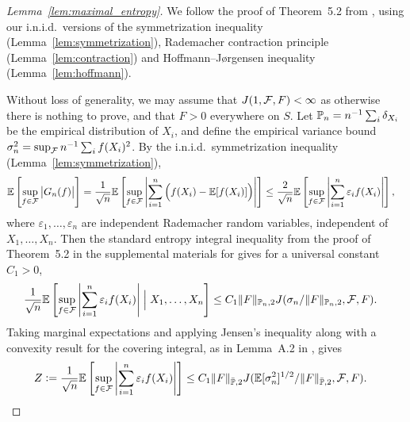 \begin{proof}[Lemma~\ref{lem:maximal_entropy}]

  We follow the proof of Theorem~5.2
  from \citet{chernozhukov2014gaussian},
  using our i.n.i.d.\ versions of the symmetrization inequality
  (Lemma~\ref{lem:symmetrization}),
  Rademacher contraction principle
  (Lemma~\ref{lem:contraction})
  and Hoffmann--J{\o}rgensen inequality
  (Lemma~\ref{lem:hoffmann}).

  Without loss of generality,
  we may assume that $J(1, \cF, F) < \infty$
  as otherwise there is nothing to prove,
  and that $F > 0$ everywhere on $S$.
  Let $\P_n = n^{-1} \sum_i \delta_{X_i}$
  be the empirical distribution
  of $X_i$,
  and define the empirical variance bound
  $\sigma_n^2 = \sup_\cF n^{-1} \sum_i f(X_i)^2$.
  By the i.n.i.d.\ symmetrization inequality
  (Lemma~\ref{lem:symmetrization}),
  \begin{align*}
    \E \left[
      \sup_{f \in \cF}
      \big| G_n(f) \big|
    \right]
    &=
    \frac{1}{\sqrt n}
    \E \left[
      \sup_{f \in \cF}
      \left|
      \sum_{i=1}^n
      \Big(
      f(X_i)
      - \E[f(X_i)]
      \Big)
      \right|
    \right]
    \leq
    \frac{2}{\sqrt n}
    \E \left[
      \sup_{f \in \cF}
      \left|
      \sum_{i=1}^n
      \varepsilon_i
      f(X_i)
      \right|
    \right],
  \end{align*}
  where $\varepsilon_1, \ldots, \varepsilon_n$
  are independent Rademacher random variables,
  independent of $X_1, \ldots, X_n$.
  Then the standard entropy integral inequality
  from the proof of Theorem~5.2 in
  the supplemental materials for
  \citet{chernozhukov2014gaussian}
  gives for a universal constant $C_1 > 0$,
  \begin{align*}
    \frac{1}{\sqrt n}
    \E \left[
      \sup_{f \in \cF}
      \left|
      \sum_{i=1}^n
      \varepsilon_i
      f(X_i)
      \right|
      \Bigm\vert
      X_1, \ldots, X_n
    \right]
    &\leq
    C_1 \|F\|_{\P_n,2}
    J(\sigma_n / \|F\|_{\P_n,2}, \cF, F).
  \end{align*}
  Taking marginal expectations
  and applying Jensen's inequality along with
  a convexity result for the covering integral,
  as in Lemma~A.2 in \citet{chernozhukov2014gaussian},
  gives
  \begin{align*}
    Z
    &\vcentcolon=
    \frac{1}{\sqrt n}
    \E \left[
      \sup_{f \in \cF}
      \left|
      \sum_{i=1}^n
      \varepsilon_i
      f(X_i)
      \right|
    \right]
    \leq
    C_1 \|F\|_{\bar\P,2}
    J(\E[\sigma_n^2]^{1/2} / \|F\|_{\bar\P,2}, \cF, F).

\end{align*}
\end{proof}
